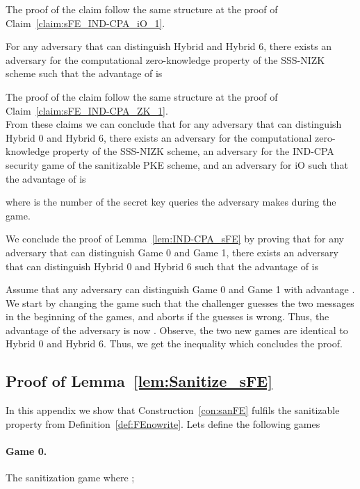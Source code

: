 \documentclass{llncs}
\begin{document}
The proof of the claim follow the same structure at the proof of Claim~\ref{claim:sFE_IND-CPA_iO_1}.

\begin{claim} \label{claim:sFE_IND-CPA_ZK_2}
For any adversary  that can distinguish Hybrid  and Hybrid 6, there exists an adversary  for the computational zero-knowledge property of the SSS-NIZK scheme such that the advantage of  is
	
\end{claim}

The proof of the claim follow the same structure at the proof of Claim~\ref{claim:sFE_IND-CPA_ZK_1}. \\

From these claims we can conclude that for any adversary  that can distinguish Hybrid 0 and Hybrid 6, there exists an adversary  for the computational zero-knowledge property of the SSS-NIZK scheme, an adversary  for the IND-CPA security game of the sanitizable PKE scheme, and an adversary  for iO such that the advantage of  is
	
	where  is the number of the secret key queries the adversary makes during the game.

We conclude the proof of Lemma~\ref{lem:IND-CPA_sFE} by proving that for any adversary  that can distinguish Game 0 and Game 1, there exists an adversary  that can distinguish Hybrid 0 and Hybrid 6 such that the advantage of  is 

Assume that any adversary  can distinguish Game 0 and Game 1 with advantage . 
We start by changing the game such that the challenger guesses the two messages in the beginning of the games, and aborts if the guesses is wrong. Thus, the advantage of the adversary is now .
Observe, the two new games are identical to Hybrid 0 and Hybrid 6. Thus, we get the inequality which concludes the proof.




\subsection{Proof of Lemma~\ref{lem:Sanitize_sFE}}\label{app:Sanitize_sFE}
\setcounter{claimcounter}{0}

In this appendix we show that Construction~\ref{con:sanFE} fulfils the sanitizable property from Definition~\ref{def:FEnowrite}.
Lets define the following games
\paragraph{Game 0.} The sanitization game where ;
\end{document}

